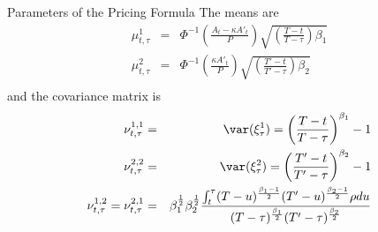 {Parameters of the Pricing Formula}
The means are
\begin{eqnarray}\nonumber
\mu^1_{t,\tau} &=& \Phi^{-1}\left(\frac{A_t - \kappa A'_t}{P}\right) \sqrt{\left(\frac{T-t}{T-\tau}\right)\beta_1}\\\nonumber
\mu^2_{t,\tau} &=& \Phi^{-1}\left(\frac{\kappa A'_t}{P}\right) \sqrt{\left(\frac{T'-t}{T'-\tau}\right)\beta_2}\\\nonumber
\end{eqnarray}
and the covariance matrix is
\begin{eqnarray}\nonumber
\nu^{1,1}_{t,\tau} &=& \var(\xi_\tau^1) =  \left(\frac{T-t}{T-\tau}\right)^{\beta_1}-1\\\nonumber
\nu^{2,2}_{t,\tau} &=& \var(\xi_\tau^2) =  \left(\frac{T'-t}{T'-\tau}\right)^{\beta_2}-1\\\nonumber
\nu^{1,2}_{t,\tau}= \nu^{2,1}_{t,\tau} &=& \beta_1^\frac{1}{2}\beta_2^\frac{1}{2}
\frac{\int_t^\tau (T-u)^\frac{\beta_1-1}{2} (T'-u)^\frac{\beta_2-1}{2} \rho du}{(T-\tau)^\frac{\beta_1}{2} (T'-\tau)^\frac{\beta_2}{2}} \\\nonumber
\end{eqnarray}
